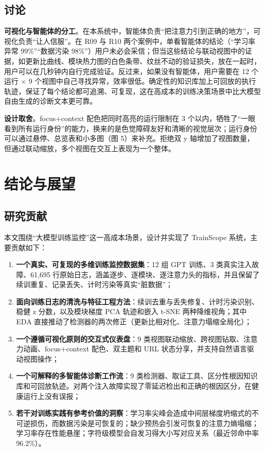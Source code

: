 \subsection{讨论}

\textbf{可视化与智能体的分工}。在本系统中，智能体负责“把注意力引到正确的地方”，可视化负责“让人信服”。在 R09 与 R10 两个案例中，单看智能体的结论（“学习率异常 99\%”“数据污染 98\%”）用户未必会采信；但当这些结论与联动视图中的证据，如更新比曲线、模块热力图的白色条带、纹丝不动的验证损失，放在一起时，用户可以在几秒钟内自行完成验证。反过来，如果没有智能体，用户需要在 12 个运行 $\times$ 9 个视图中自己寻找异常，效率很低。确定性的知识库加上可回放的执行轨迹，保证了每个结论都可追溯、可复现，这在高成本的训练决策场景中比大模型自由生成的诊断文本更可靠。

\textbf{设计取舍}。focus+context 配色把同时高亮的运行限制在 3 个以内，牺牲了“一眼看到所有运行身份”的能力，换来的是色觉障碍友好和清晰的视觉层次；运行身份可以通过悬停、总览表和小多图（图 5）来补充。拒绝双 y 轴增加了视图数量，但通过联动缩放，多个视图在交互上表现为一个整体。

\section{结论与展望}

\subsection{研究贡献}

本文围绕“大模型训练监控”这一高成本场景，设计并实现了 TrainScope 系统，主要贡献如下：

\begin{enumerate}
\item \textbf{一个真实、可复现的多维训练监控数据集}：12 组 GPT 训练、3 类真实注入故障、61,695 行原始日志，涵盖逐步、逐模块、逐注意力头的指标，并且保留了续训重复、记录丢失、计时污染等真实“脏数据”；
\item \textbf{面向训练日志的清洗与特征工程方法}：续训去重与丢失修复、计时污染识别、稳健 z 分数，以及模块梯度 PCA 轨迹和嵌入 t-SNE 两种降维视角；其中 EDA 直接推动了检测器的两次修正（更新比相对化、注意力塌缩全局化）；
\item \textbf{一个遵循可视化原则的交互式仪表盘}：9 类视图联动缩放、跨视图钻取、注意力动画、focus+context 配色、双主题和 URL 状态分享，并支持自然语言驱动视图操作；
\item \textbf{一个可解释的多智能体诊断工作流}：9 类检测器、取证工具、区分性根因知识库和可回放轨迹。对两个注入故障实现了零延迟检出和正确的根因区分，在健康运行上没有误报；
\item \textbf{若干对训练实践有参考价值的洞察}：学习率尖峰会造成中间层梯度坍缩式的不可逆损伤，而数据污染是可恢复的；缺少预热会引发可恢复的注意力熵塌缩；学习率存在性能悬崖；字符级模型会自发习得大小写对应关系（最近邻命中率 96.2\%）。
\end{enumerate}

